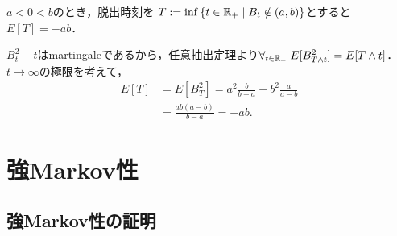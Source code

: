 \documentclass[uplatex,dvipdfmx]{jsreport}
\begin{document}
\begin{proposition}[脱出時刻の期待値]\label{prop-mean-of-Brownian-exit-time}
    $a<0<b$のとき，脱出時刻を
    $T:=\inf\left\{t\in\mathbb{R}_+\mid B_t\notin(a,b)\right\}$とすると$E[T]=-ab$．
\end{proposition}
\begin{Proof}
    $B_t^2-t$はmartingaleであるから，任意抽出定理より$\forall_{t\in\mathbb{R}_+}\;E[B^2_{T\land t}]=E[T\land t]$．
    $t\to\infty$の極限を考えて，
    \begin{align*}
        E[T]&=E[B_T^2]=a^2\frac{b}{b-a}+b^2\frac{a}{a-b}\\
        &=\frac{ab(a-b)}{b-a}=-ab.
    \end{align*}
\end{Proof}

\section{強Markov性}

\subsection{強Markov性の証明}
\end{document}

